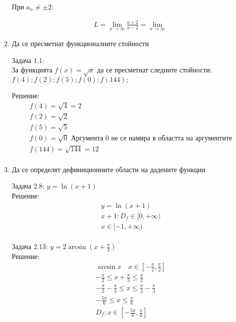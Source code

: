 \documentclass[a4paper, 20pt, fleqn, border=2pt]{article}
\begin{document}
\begin{enumerate}
При $a_n \neq \pm 2$:

\begin{equation}
\begin{split}
    L = \lim_{x\to\infty}\frac{a+2}{a-2} = \lim_{x\to\infty}\frac{}{} 
\end{split}
\end{equation}


    \item Да се пресметнат функционалните стойности
\par
\par

Задача 1.1: \\
За функцията $f(x) = \sqrt{x}$ да се пресметнат следните стойности: 
\\
$f(4); f(2); f(5); f(0); f(144);$
\par
Решение:
\begin{equation}
\begin{split}
    f(4) = \sqrt{4} = 2 \\
    f(2) = \sqrt{2} \\
    f(5) = \sqrt{5} \\
    f(0) = \sqrt{0} \text{  Аргумента 0 не се намира в областта на аргументите} \\
    f(144) = \sqrt{144} = 12 \\
\end{split}
\end{equation}


    \item Да се определят дефиниционните области на дадените функции
\par
\par
Задача 2.8: $y = \ln(x + 1)$
\\
Решение:
\begin{equation}
\begin{split}
    y = \ln(x + 1) \\
    x + 1: D_f \in [0, +\infty) \\
    x \in [-1, +\infty)
\end{split}
\end{equation}
\\
Задача 2.13: $y = 2\arcsin{(x + \frac{\pi}{3})}$
\\
Решение:
\begin{equation}
\begin{split}
    \arcsin{x} \quad x \in [-\frac{\pi}{2}, \frac{\pi}{2}] \\
    -\frac{\pi}{2} \leq x + \frac{\pi}{3} \leq \frac{\pi}{2} \\
    -\frac{\pi}{2} - \frac{\pi}{3} \leq x \leq \frac{\pi}{2} - \frac{\pi}{3} \\
    -\frac{5\pi}{6} \leq x \leq \frac{\pi}{6} \\
    D_f : x \in [-\frac{5\pi}{6}, \frac{\pi}{6}]
\end{split}
\end{equation}


\end{enumerate}
\end{document}

